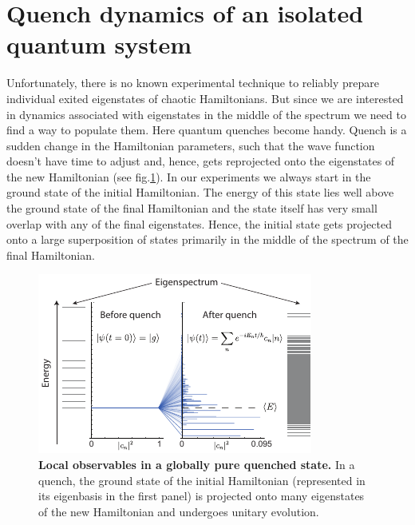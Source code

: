 \section{Quench dynamics of an isolated quantum system}

Unfortunately, there is no known experimental technique to reliably prepare individual exited eigenstates of chaotic Hamiltonians. But since we are interested in dynamics associated with eigenstates in the middle of the spectrum we need to find a way to populate them. Here quantum quenches become handy. Quench is a sudden change in the Hamiltonian parameters, such that the wave function doesn't have time to adjust and, hence, gets reprojected onto the eigenstates of the new Hamiltonian (see fig.\ref{fig:ETH_quench}). In our experiments we always start in the ground state of the initial Hamiltonian. The energy of this state lies well above the ground state of the final Hamiltonian and the state itself has very small overlap with any of the final eigenstates. Hence, the initial state gets projected onto a large superposition of states primarily in the middle of the spectrum of the final Hamiltonian. 

\begin{figure}[t!]
	\centering
	\includegraphics[scale=2.0]{figures/ETH_quench.pdf}
	\caption{{\bf Local observables in a globally pure quenched state.} In a quench, the ground state of the initial Hamiltonian (represented in its eigenbasis in the first panel) is projected onto many eigenstates of the new Hamiltonian and undergoes unitary evolution.}
	\label{fig:ETH_quench}
\end{figure}

